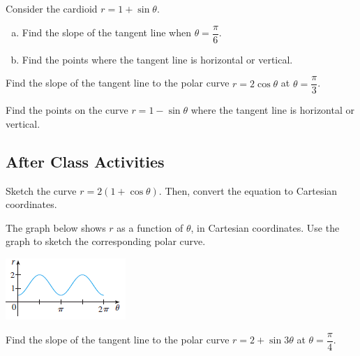 \documentclass[notes]{subfiles}
\begin{document}
		\begin{ex}
			Consider the cardioid $r = 1 + \sin\theta$.
				\begin{enumerate}[(a)]
					\item Find the slope of the tangent line when $\theta = \dfrac{\pi}{6}$.
					\item Find the points where the tangent line is horizontal or vertical.
				\end{enumerate}
		\end{ex}
			\newpage
			
		\begin{ex}
			Find the slope of the tangent line to the polar curve $r = 2\cos\theta$ at $\theta = \dfrac{\pi}{3}$.
		\end{ex}
			\vs{1}
			
		\begin{ex}
			Find the points on the curve $r = 1-\sin\theta$ where the tangent line is horizontal or vertical.
		\end{ex}
			\vs{1}
			\newpage
			
	\subsection*{After Class Activities}
		\begin{ex}
			Sketch the curve $r = 2(1+\cos\theta)$.  Then, convert the equation to Cartesian coordinates.
		\end{ex}
			
		\begin{ex}
			The graph below shows $r$ as a function of $\theta$, in Cartesian coordinates.  Use the graph to sketch the corresponding polar curve.\\
			\begin{flushleft}
				\includegraphics[scale = 1.25]{103_1.png}
			\end{flushleft}
		\end{ex}
			
		\begin{ex}
			Find the slope of the tangent line to the polar curve $r = 2 + \sin 3\theta$ at $\theta = \dfrac{\pi}{4}$.
		\end{ex}
			
\clearpage
\end{document}
